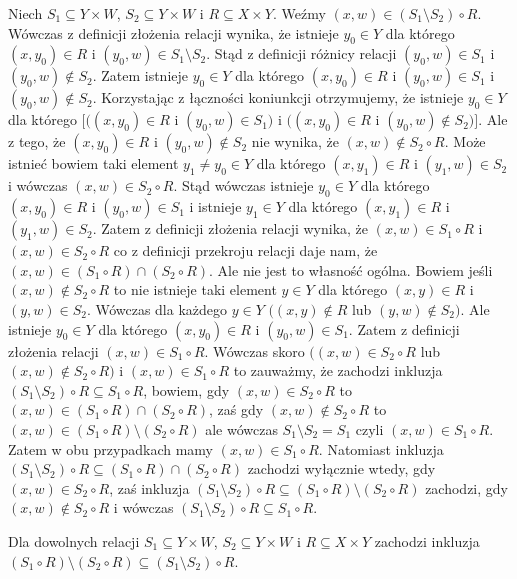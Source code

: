 \begin{exercise}
Niech $S_{1}\subseteq Y\times W$, $S_{2}\subseteq Y\times W$ i $R\subseteq X\times Y$. Weźmy $(x,w)\in(S_{1}\setminus S_{2})\circ R$. Wówczas z definicji złożenia relacji wynika, że istnieje $y_{0}\in Y$ dla którego $(x,y_{0})\in R$ i $(y_{0},w)\in S_{1}\setminus S_{2}$. Stąd z definicji różnicy relacji $(y_{0},w)\in S_{1}$ i $(y_{0},w)\notin S_{2}$. Zatem istnieje $y_{0}\in Y$ dla którego $(x,y_{0})\in R$ i $(y_{0},w)\in S_{1}$ i $(y_{0},w)\notin S_{2}$. Korzystając z łączności koniunkcji otrzymujemy, że istnieje $y_{0}\in Y$ dla którego $[((x,y_{0})\in R$ i $(y_{0},w)\in S_{1})$ i $((x,y_{0})\in R$ i $(y_{0},w)\notin S_{2})]$. Ale z tego, że $(x,y_{0})\in R$ i $(y_{0},w)\notin S_{2}$ nie wynika, że $(x,w)\notin S_{2}\circ R$. Może istnieć bowiem taki element $y_{1}\ne y_{0}\in Y$ dla którego $(x,y_{1})\in R$ i $(y_{1},w)\in S_{2}$ i wówczas $(x,w)\in S_{2}\circ R$. Stąd wówczas istnieje $y_{0}\in Y$ dla którego $(x,y_{0})\in R$ i $(y_{0},w)\in S_{1}$ i istnieje $y_{1}\in Y$ dla którego $(x,y_{1})\in R$ i $(y_{1},w)\in S_{2}$.  Zatem z definicji złożenia relacji wynika, że $(x,w)\in S_{1}\circ R$ i $(x,w)\in S_{2}\circ R$ co z definicji przekroju relacji daje nam, że $(x,w)\in(S_{1}\circ R)\cap(S_{2}\circ R)$. Ale nie jest to własność ogólna. Bowiem jeśli $(x,w)\notin S_{2}\circ R$ to nie istnieje taki element $y\in Y$ dla którego $(x,y)\in R$ i $(y,w)\in S_{2}$. Wówczas dla każdego $y\in Y$ $((x,y)\notin R$ lub $(y,w)\notin S_{2})$. Ale istnieje $y_{0}\in Y$ dla którego $(x,y_{0})\in R$ i $(y_{0},w)\in S_{1}$. Zatem z definicji złożenia relacji $(x,w)\in S_{1}\circ R$. Wówczas skoro $((x,w)\in S_{2}\circ R$ lub $(x,w)\notin S_{2}\circ R)$ i $(x,w)\in S_{1}\circ R$ to zauważmy, że zachodzi inkluzja $(S_{1}\setminus S_{2})\circ R\subseteq S_{1}\circ R$, bowiem, gdy $(x,w)\in S_{2}\circ R$ to $(x,w)\in(S_{1}\circ R)\cap(S_{2}\circ R)$, zaś gdy $(x,w)\notin S_{2}\circ R$ to $(x,w)\in(S_{1}\circ R)\setminus(S_{2}\circ R)$ ale wówczas $S_{1}\setminus S_{2}=S_{1}$ czyli $(x,w)\in S_{1}\circ R$. Zatem w obu przypadkach mamy $(x,w)\in S_{1}\circ R$. Natomiast inkluzja $(S_{1}\setminus S_{2})\circ R\subseteq(S_{1}\circ R)\cap(S_{2}\circ R)$ zachodzi wyłącznie wtedy, gdy $(x,w)\in S_{2}\circ R$, zaś inkluzja $(S_{1}\setminus S_{2})\circ R\subseteq(S_{1}\circ R)\setminus(S_{2}\circ R)$ zachodzi, gdy $(x,w)\notin S_{2}\circ R$ i wówczas $(S_{1}\setminus S_{2})\circ R\subseteq S_{1}\circ R$.
\end{exercise}
\begin{property}
Dla dowolnych relacji $S_{1}\subseteq Y\times W$, $S_{2}\subseteq Y\times W$ i $R\subseteq X\times Y$ zachodzi inkluzja $(S_{1}\circ R)\setminus(S_{2}\circ R)\subseteq(S_{1}\setminus S_{2})\circ R$.
\end{property}
